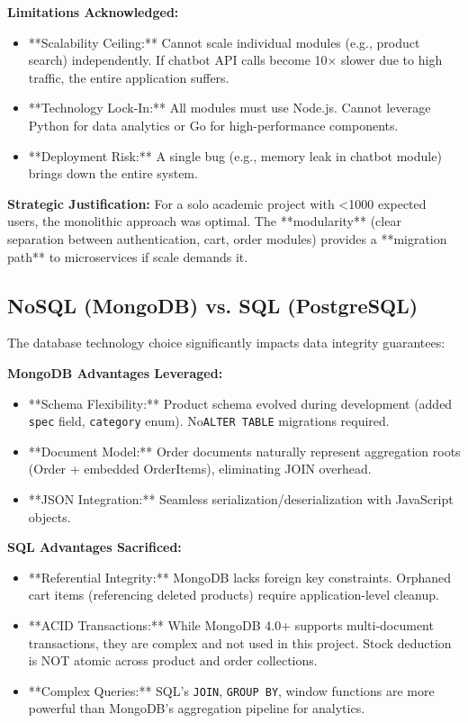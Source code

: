 \textbf{Limitations Acknowledged:}
\begin{itemize}
    \item **Scalability Ceiling:** Cannot scale individual modules (e.g., product search) independently. If chatbot API calls become 10× slower due to high traffic, the entire application suffers.
    \item **Technology Lock-In:** All modules must use Node.js. Cannot leverage Python for data analytics or Go for high-performance components.
    \item **Deployment Risk:** A single bug (e.g., memory leak in chatbot module) brings down the entire system.
\end{itemize}

\textbf{Strategic Justification:} For a solo academic project with \textless 1000 expected users, the monolithic approach was optimal. The **modularity** (clear separation between authentication, cart, order modules) provides a **migration path** to microservices if scale demands it.

\subsection{NoSQL (MongoDB) vs. SQL (PostgreSQL)}

The database technology choice significantly impacts data integrity guarantees:

\textbf{MongoDB Advantages Leveraged:}
\begin{itemize}
    \item **Schema Flexibility:** Product schema evolved during development (added \texttt{spec} field, \texttt{category} enum). No\texttt{ALTER TABLE} migrations required.
    \item **Document Model:** Order documents naturally represent aggregation roots (Order + embedded OrderItems), eliminating JOIN overhead.
    \item **JSON Integration:** Seamless serialization/deserialization with JavaScript objects.
\end{itemize}

\textbf{SQL Advantages Sacrificed:}
\begin{itemize}
    \item **Referential Integrity:** MongoDB lacks foreign key constraints. Orphaned cart items (referencing deleted products) require application-level cleanup.
    \item **ACID Transactions:** While MongoDB 4.0+ supports multi-document transactions, they are complex and not used in this project. Stock deduction is NOT atomic across product and order collections.
    \item **Complex Queries:** SQL's \texttt{JOIN}, \texttt{GROUP BY}, window functions are more powerful than MongoDB's aggregation pipeline for analytics.
\end{itemize}

